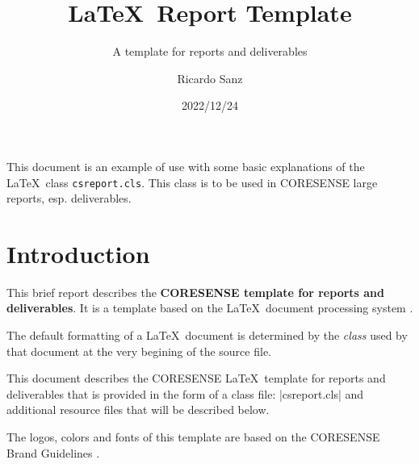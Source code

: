 \documentclass{csreport}
\begin{document}

\title{\LaTeX\ Report Template}
\subtitle{A template for reports and deliverables}
\author{Ricardo Sanz}
\date{2022/12/24}

\greencover
\maketitle

\executivesummary

This document is an example of use with some basic explanations of the \LaTeX\ class \texttt{csreport.cls}. This class is to be used in CORESENSE large reports, esp. deliverables.

\documentversions
{}


\tableofcontents



\chapter{Introduction}

This brief report describes the \textbf{CORESENSE template for reports and deliverables}. It is a template based on the \LaTeX\ document processing system \cite{Lamport-1986}.

The default formatting of a \LaTeX\ document is determined by the \emph{class} used by that document at the very begining of the source file. 

This document describes the CORESENSE \LaTeX\ template for reports and deliverables that is provided in the form of a class file: \code|csreport.cls| and additional resource files that will be described below.

The logos, colors and fonts of this template are based on the CORESENSE Brand Guidelines \cite{CORESENSE-017}.

\vfill

\end{document}
